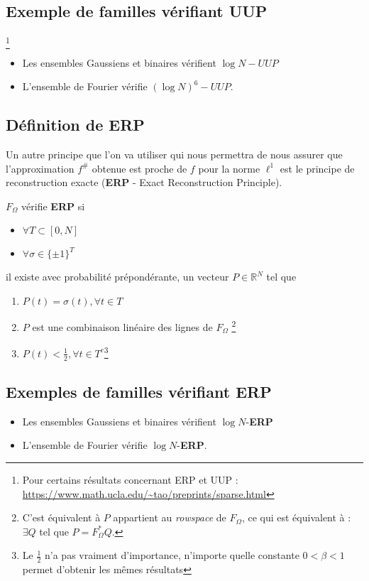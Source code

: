 \subsection{Exemple de familles vérifiant \textbf{UUP}}
\begin{proposition}\footnote{Pour certains résultats concernant ERP et UUP : \url{https://www.math.ucla.edu/~tao/preprints/sparse.html}}
	\newline 
	\begin{itemize}
		\item Les ensembles Gaussiens et binaires vérifient $\log N-UUP$
		\item L'ensemble de Fourier vérifie $(\log N)^6-UUP$.
	\end{itemize}
\end{proposition}
\subsection{Définition de \textbf{ERP}}
Un autre principe que l'on va utiliser qui nous permettra de nous assurer que l'approximation $f^\#$ obtenue est proche de $f$ pour la norme $\ell^1$ est le principe de reconstruction exacte (\textbf{ERP} - Exact Reconstruction Principle).
\begin{definition}
	$F_\Omega$ vérifie \textbf{ERP} si
	\begin{itemize}
		\item $\forall T \subset [0, N]$
		\item $\forall \sigma \in \{\pm 1\}^T$
	\end{itemize}
	il existe avec probabilité prépondérante, un vecteur $P\in \mathbb{R}^N$ tel que
	\begin{enumerate}
		\item $P(t) = \sigma(t), \forall t \in T$
		\item $P$ est une combinaison linéaire des lignes de $F_\Omega$ \footnote{ C'est équivalent à $P$ appartient au \textit{rowspace} de $F_\Omega$, ce qui est équivalent à : $\exists Q$ tel que $P = F_\Omega ^* Q$.}
		\item $P(t) < \frac{1}{2}, \forall t \in T^c$\footnote{Le $\frac{1}{2}$ n'a pas vraiment d'importance, n'importe quelle constante $0 < \beta < 1$ permet d'obtenir les mêmes résultats} 
	\end{enumerate}
\end{definition}
\subsection{Exemples de familles vérifiant \textbf{ERP}}
\begin{proposition} 
	\begin{itemize}
		\item Les ensembles Gaussiens et binaires vérifient $\log N$-\textbf{ERP}
		\item L'ensemble de Fourier vérifie $\log N$-\textbf{ERP}.
	\end{itemize}
\end{proposition}

